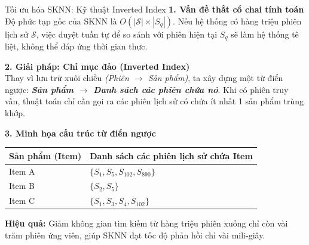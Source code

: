\documentclass[aspectratio=169, 11pt]{beamer}
\begin{document}
\begin{frame}{Tối ưu hóa SKNN: Kỹ thuật Inverted Index}
    \vspace{-0.25cm}
    \footnotesize
    \textbf{1. Vấn đề thắt cổ chai tính toán}\\
    \vspace{0.05cm}
    Độ phức tạp gốc của SKNN là $O(|\mathcal{S}| \times |S_q|)$. Nếu hệ thống có hàng triệu phiên lịch sử $\mathcal{S}$, việc duyệt tuần tự để so sánh với phiên hiện tại $S_q$ sẽ làm hệ thống tê liệt, không thể đáp ứng thời gian thực.

    \vspace{0.1cm}
    \textbf{2. Giải pháp: Chỉ mục đảo (Inverted Index)}\\
    \vspace{0.05cm}
    Thay vì lưu trữ xuôi chiều \textit{(Phiên $\rightarrow$ Sản phẩm)}, ta xây dựng một từ điển ngược: \textbf{\textit{Sản phẩm $\rightarrow$ Danh sách các phiên chứa nó}}. Khi có phiên truy vấn, thuật toán chỉ cần gọi ra các phiên lịch sử có chứa ít nhất 1 sản phẩm trùng khớp.

    \vspace{0.1cm}
    \textbf{3. Minh họa cấu trúc từ điển ngược}\\
    \vspace{0.05cm}
    \scriptsize
    \centering
    \begin{tabular}{ll}
        \toprule
        \textbf{Sản phẩm (Item)} & \textbf{Danh sách các phiên lịch sử chứa Item} \\
        \midrule
        Item A & $\{S_1, S_5, S_{102}, S_{890}\}$ \\
        Item B & $\{S_2, S_5\}$ \\
        Item C & $\{S_1, S_3, S_4, S_{102}\}$ \\
        \bottomrule
    \end{tabular}

    \vspace{0.1cm}
    \flushleft
    \textbf{Hiệu quả:} Giảm không gian tìm kiếm từ hàng triệu phiên xuống chỉ còn vài trăm phiên ứng viên, giúp SKNN đạt tốc độ phản hồi chỉ vài mili-giây.
\end{frame}
\end{document}

